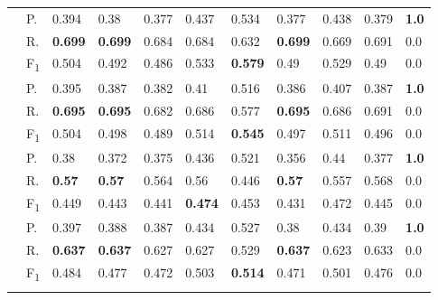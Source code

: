 \begin{tabularx}{\textwidth}{p{1.3em}l Z  Z  Z  Z  Z  Z  Z  Z  Z }
    & P.    & 0.394    & 0.38    & 0.377    & 0.437    & 0.534    & 0.377    & 0.438    & 0.379    & \textbf{ 1.0 } \\
    & R.    & \textbf{ 0.699 }    & \textbf{ 0.699 }    & 0.684    & 0.684    & 0.632    & \textbf{ 0.699 }    & 0.669    & 0.691    & 0.0 \\
    & F\textsubscript{1}    & 0.504    & 0.492    & 0.486    & 0.533    & \textbf{ 0.579 }    & 0.49    & 0.529    & 0.49    & 0.0 \\
     \midrule {}

    & P.    & 0.395    & 0.387    & 0.382    & 0.41    & 0.516    & 0.386    & 0.407    & 0.387    & \textbf{ 1.0 } \\
    & R.    & \textbf{ 0.695 }    & \textbf{ 0.695 }    & 0.682    & 0.686    & 0.577    & \textbf{ 0.695 }    & 0.686    & 0.691    & 0.0 \\
    & F\textsubscript{1}    & 0.504    & 0.498    & 0.489    & 0.514    & \textbf{ 0.545 }    & 0.497    & 0.511    & 0.496    & 0.0 \\
     \midrule {}

    & P.    & 0.38    & 0.372    & 0.375    & 0.436    & 0.521    & 0.356    & 0.44    & 0.377    & \textbf{ 1.0 } \\
    & R.    & \textbf{ 0.57 }    & \textbf{ 0.57 }    & 0.564    & 0.56    & 0.446    & \textbf{ 0.57 }    & 0.557    & 0.568    & 0.0 \\
    & F\textsubscript{1}    & 0.449    & 0.443    & 0.441    & \textbf{ 0.474 }    & 0.453    & 0.431    & 0.472    & 0.445    & 0.0 \\
     \midrule {}

    & P.    & 0.397    & 0.388    & 0.387    & 0.434    & 0.527    & 0.38    & 0.434    & 0.39    & \textbf{ 1.0 } \\
    & R.    & \textbf{ 0.637 }    & \textbf{ 0.637 }    & 0.627    & 0.627    & 0.529    & \textbf{ 0.637 }    & 0.623    & 0.633    & 0.0 \\
    & F\textsubscript{1}    & 0.484    & 0.477    & 0.472    & 0.503    & \textbf{ 0.514 }    & 0.471    & 0.501    & 0.476    & 0.0 \\
     \midrule {}

\end{tabularx}